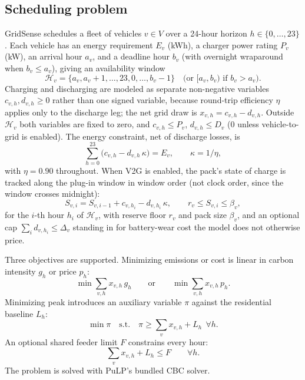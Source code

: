 \documentclass[journal]{IEEEtran}
\begin{document}
\subsection{Scheduling problem}
GridSense schedules a fleet of vehicles $v \in V$ over a 24-hour horizon $h \in \{0,\dots,23\}$. Each vehicle has an energy requirement $E_v$ (kWh), a charger power rating $P_v$ (kW), an arrival hour $a_v$, and a deadline hour $b_v$ (with overnight wraparound when $b_v \le a_v$), giving an availability window
\begin{equation}
\mathcal{H}_v = \{a_v, a_v{+}1, \dots, 23, 0, \dots, b_v{-}1\} \quad \text{(or } [a_v,b_v) \text{ if } b_v>a_v\text{).}
\label{eq:window}
\end{equation}
Charging and discharging are modeled as separate non-negative variables $c_{v,h}, d_{v,h} \ge 0$ rather than one signed variable, because round-trip efficiency $\eta$ applies only to the discharge leg; the net grid draw is $x_{v,h} = c_{v,h} - d_{v,h}$. Outside $\mathcal{H}_v$ both variables are fixed to zero, and $c_{v,h}\le P_v$, $d_{v,h}\le D_v$ (0 unless vehicle-to-grid is enabled). The energy constraint, net of discharge losses, is
\begin{equation}
\sum_{h=0}^{23} \big(c_{v,h} - d_{v,h}\,\kappa\big) = E_v, \qquad \kappa = 1/\eta,
\label{eq:energy}
\end{equation}
with $\eta = 0.90$ throughout. When V2G is enabled, the pack's state of charge is tracked along the plug-in window in window order (not clock order, since the window crosses midnight):
\begin{equation}
S_{v,i} = S_{v,i-1} + c_{v,h_i} - d_{v,h_i}\,\kappa, \qquad r_v \le S_{v,i} \le \beta_v,
\label{eq:soc}
\end{equation}
for the $i$-th hour $h_i$ of $\mathcal{H}_v$, with reserve floor $r_v$ and pack size $\beta_v$, and an optional cap $\sum_i d_{v,h_i} \le \Delta_v$ standing in for battery-wear cost the model does not otherwise price.

Three objectives are supported. Minimizing emissions or cost is linear in carbon intensity $g_h$ or price $p_h$:
\begin{equation}
\min \sum_{v,h} x_{v,h}\, g_h \qquad \text{or} \qquad \min \sum_{v,h} x_{v,h}\, p_h .
\label{eq:obj-linear}
\end{equation}
Minimizing peak introduces an auxiliary variable $\pi$ against the residential baseline $L_h$:
\begin{equation}
\min \pi \quad \text{s.t.}\quad \pi \ge \sum_v x_{v,h} + L_h \ \ \forall h.
\label{eq:obj-peak}
\end{equation}
An optional shared feeder limit $F$ constrains every hour:
\begin{equation}
\sum_v x_{v,h} + L_h \le F \qquad \forall h.
\label{eq:feeder}
\end{equation}
The problem is solved with PuLP's bundled CBC solver.
\end{document}
